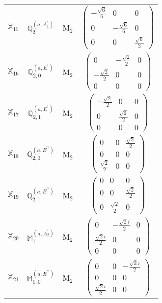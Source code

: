 \documentclass[fleqn,10pt,landscape]{article}
\begin{document}
\begin{itemize}
\begin{center}
\begin{longtable}{c|c|c|c}
$ \mathbb{X}_{15} $ & $\mathbb{Q}_{2}^{(a,A_{1}^{\prime})}$ & M$_{2}$ & $\begin{pmatrix} - \frac{\sqrt{6}}{6} & 0 & 0 \\ 0 & - \frac{\sqrt{6}}{6} & 0 \\ 0 & 0 & \frac{\sqrt{6}}{3} \end{pmatrix}$ \\
$ \mathbb{X}_{16} $ & $\mathbb{Q}_{2,0}^{(a,E^{\prime})}$ & M$_{2}$ & $\begin{pmatrix} 0 & - \frac{\sqrt{2}}{2} & 0 \\ - \frac{\sqrt{2}}{2} & 0 & 0 \\ 0 & 0 & 0 \end{pmatrix}$ \\
$ \mathbb{X}_{17} $ & $\mathbb{Q}_{2,1}^{(a,E^{\prime})}$ & M$_{2}$ & $\begin{pmatrix} - \frac{\sqrt{2}}{2} & 0 & 0 \\ 0 & \frac{\sqrt{2}}{2} & 0 \\ 0 & 0 & 0 \end{pmatrix}$ \\
$ \mathbb{X}_{18} $ & $\mathbb{Q}_{2,0}^{(a,E^{\prime\prime})}$ & M$_{2}$ & $\begin{pmatrix} 0 & 0 & \frac{\sqrt{2}}{2} \\ 0 & 0 & 0 \\ \frac{\sqrt{2}}{2} & 0 & 0 \end{pmatrix}$ \\
$ \mathbb{X}_{19} $ & $\mathbb{Q}_{2,1}^{(a,E^{\prime\prime})}$ & M$_{2}$ & $\begin{pmatrix} 0 & 0 & 0 \\ 0 & 0 & \frac{\sqrt{2}}{2} \\ 0 & \frac{\sqrt{2}}{2} & 0 \end{pmatrix}$ \\
$ \mathbb{X}_{20} $ & $\mathbb{M}_{1}^{(a,A_{2}^{\prime})}$ & M$_{2}$ & $\begin{pmatrix} 0 & - \frac{\sqrt{2} i}{2} & 0 \\ \frac{\sqrt{2} i}{2} & 0 & 0 \\ 0 & 0 & 0 \end{pmatrix}$ \\
$ \mathbb{X}_{21} $ & $\mathbb{M}_{1,0}^{(a,E^{\prime\prime})}$ & M$_{2}$ & $\begin{pmatrix} 0 & 0 & - \frac{\sqrt{2} i}{2} \\ 0 & 0 & 0 \\ \frac{\sqrt{2} i}{2} & 0 & 0 \end{pmatrix}$ \\

\end{longtable}
\end{center}
\end{itemize}
\end{document}
